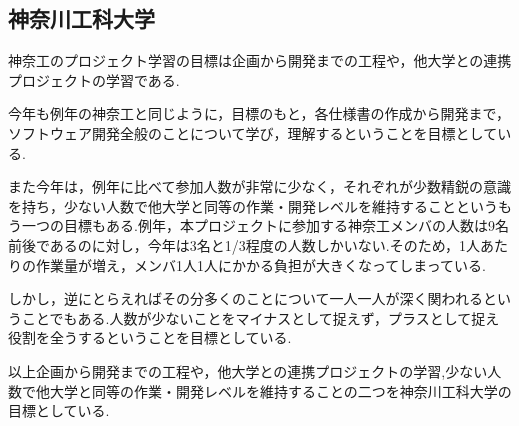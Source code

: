 \subsection{神奈川工科大学}
\par
神奈工のプロジェクト学習の目標は企画から開発までの工程や，他大学との連携プロジェクトの学習である.
\par
今年も例年の神奈工と同じように，目標のもと，各仕様書の作成から開発まで，ソフトウェア開発全般のことについて学び，理解するということを目標としている.
\par
また今年は，例年に比べて参加人数が非常に少なく，それぞれが少数精鋭の意識を持ち，少ない人数で他大学と同等の作業・開発レベルを維持することというもう一つの目標もある.例年，本プロジェクトに参加する神奈工メンバの人数は9名前後であるのに対し，今年は3名と1/3程度の人数しかいない.そのため，1人あたりの作業量が増え，メンバ1人1人にかかる負担が大きくなってしまっている.
\par
しかし，逆にとらえればその分多くのことについて一人一人が深く関われるということでもある.人数が少ないことをマイナスとして捉えず，プラスとして捉え役割を全うするということを目標としている.
\par
以上企画から開発までの工程や，他大学との連携プロジェクトの学習,少ない人数で他大学と同等の作業・開発レベルを維持することの二つを神奈川工科大学の目標としている.

